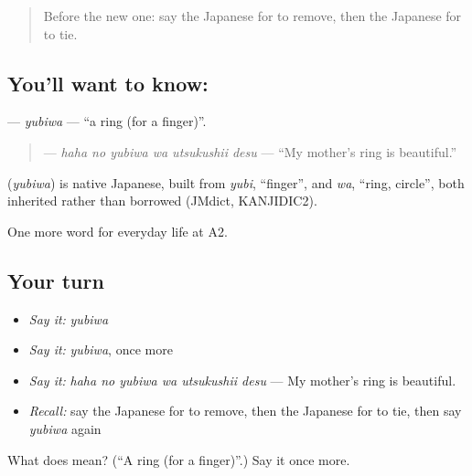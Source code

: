 \label{lesson:JA-C150-yubiwa}



\begin{quote}
Before the new one: say the Japanese for to remove, then the Japanese for to tie.
\end{quote}

\subsection*{You'll want to know: }
\textbf{} — \emph{yubiwa} — \textquotedblleft{}a ring (for a finger)\textquotedblright{}.

\begin{quote}
\textbf{  } — \emph{haha no yubiwa wa utsukushii desu} — \textquotedblleft{}My mother's ring is beautiful.\textquotedblright{}
\end{quote}

\begin{cousinweb}
\textbf{} (\emph{yubiwa}) is native Japanese, built from \emph{yubi}, \textquotedblleft{}finger\textquotedblright{}, and \emph{wa}, \textquotedblleft{}ring, circle\textquotedblright{}, both inherited rather than borrowed (JMdict, KANJIDIC2).
\end{cousinweb}

\begin{grammarlens}[title={What you've built}]
One more word for everyday life at A2.
\end{grammarlens}

\subsection*{Your turn}
\begin{itemize}
\raggedright
  \item \emph{Say it:} \emph{yubiwa}
  \item \emph{Say it:} \emph{yubiwa}, once more
  \item \emph{Say it:} \emph{haha no yubiwa wa utsukushii desu} — My mother's ring is beautiful.
  \item \emph{Recall:} say the Japanese for to remove, then the Japanese for to tie, then say \emph{yubiwa} again
\end{itemize}

\begin{tcolorbox}[breakable,colback=teal!4,colframe=teal!35!black,title={Before you move on}]
What does  mean? (\textquotedblleft{}A ring (for a finger)\textquotedblright{}.) Say it once more.
\end{tcolorbox}
